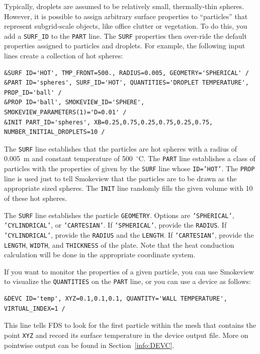 \documentclass[11pt]{book}
\newcommand{\ct}{\tt\small}
\begin{document}
Typically, droplets are assumed to be relatively small, thermally-thin spheres. However, it is possible to assign arbitrary surface properties to
``particles'' that represent subgrid-scale objects, like office clutter or vegetation. To do this, you add a {\ct SURF\_ID} to the {\ct PART} line. The
{\ct SURF} properties then over-ride the default properties assigned to particles and droplets. For example, the following input lines create a collection
of hot spheres:

\footnotesize
\begin{verbatim}
&SURF ID='HOT', TMP_FRONT=500., RADIUS=0.005, GEOMETRY='SPHERICAL' /
&PART ID='spheres', SURF_ID='HOT', QUANTITIES='DROPLET TEMPERATURE', PROP_ID='ball' /
&PROP ID='ball', SMOKEVIEW_ID='SPHERE', SMOKEVIEW_PARAMETERS(1)='D=0.01' /
&INIT PART_ID='spheres', XB=0.25,0.75,0.25,0.75,0.25,0.75, NUMBER_INITIAL_DROPLETS=10 /
\end{verbatim}
\normalsize

\noindent
The {\ct SURF} line establishes that the particles are hot spheres with a radius of 0.005~m and constant temperature of 500~$^\circ$C. The {\ct PART}
line establishes a class of particles with the properties of given by the {\ct SURF} line whose {\ct ID='HOT'}. The {\ct PROP} line is used just
to tell Smokeview that the particles are to be drawn as the appropriate sized spheres. The {\ct INIT} line randomly fills the given volume with
10 of these hot spheres.

The {\ct SURF} line establishes the particle {\ct GEOMETRY}. Options are {\ct 'SPHERICAL'}, {\ct 'CYLINDRICAL'}, or {\ct 'CARTESIAN'}. If
{\ct 'SPHERICAL'}, provide the {\ct RADIUS}. If {\ct 'CYLINDRICAL'}, provide the {\ct RADIUS} and the {\ct LENGTH}. If {\ct 'CARTESIAN'}, provide
the {\ct LENGTH}, {\ct WIDTH}, and {\ct THICKNESS} of the plate. Note that the heat conduction calculation will be done in the appropriate coordinate
system.

If you want to monitor the properties of a given particle, you can use Smokeview to visualize the {\ct QUANTITIES} on the {\ct PART} line, or you can use a device as follows:

\footnotesize
\begin{verbatim}
&DEVC ID='temp', XYZ=0.1,0.1,0.1, QUANTITY='WALL TEMPERATURE', VIRTUAL_INDEX=1 /
\end{verbatim}
\normalsize

\noindent
This line tells FDS to look for the first particle within the mesh that contains the point {\ct XYZ} and record its surface temperature in the device output file. More on 
pointwise output can be found in Section~\ref{info:DEVC}.
\end{document}
